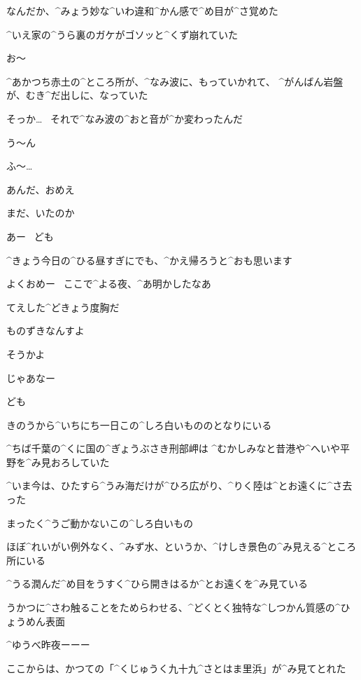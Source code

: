 \page[116]
\Alpha なんだか、^{みょう}{妙}な^{いわ}{違和}^{かん}{感}で^{め}{目}が^{さ}{覚}めた

\page[117]
\Alpha ^{いえ}{家}の^{うら}{裏}のガケがゴソッと^{くず}{崩}れていた

\Alpha お〜

\Alpha ^{あかつち}{赤土}の^{ところ}{所}が、^{なみ}{波}に、もっていかれて、
^{がんばん}{岩盤}が、むき^{だ}{出}しに、なっていた

\Alpha そっか…
\ それで^{なみ}{波}の^{おと}{音}が^{か}{変}わったんだ

\Alpha う〜ん

\page[118]
\Ayase ふ〜…

\page[121]
\Person あんだ、おめえ

\Person まだ、いたのか

\Ayase あー
\ ども

\page[122]
\Ayase ^{きょう}{今日}の^{ひる}{昼}すぎにでも、^{かえ}{帰}ろうと^{おも}{思}います

\Person よくおめー
\ ここで^{よる}{夜}、^{あ}{明}かしたなあ

\Person てえした^{どきょう}{度胸}だ

\Ayase ものずきなんすよ

\Person そうかよ

\page[123]
\Person じゃあなー

\Ayase ども

\page[124]
\Ayase きのうから^{いちにち}{一日}この^{しろ}{白}いもののとなりにいる

\Ayase ^{ちば}{千葉}の^{くに}{国}の^{ぎょうぶさき}{刑部岬}は
^{むかしみなと}{昔港}や^{へいや}{平野}を^{み}{見}おろしていた

\Ayase ^{いま}{今}は、ひたすら^{うみ}{海}だけが^{ひろ}{広}がり、^{りく}{陸}は^{とお}{遠}くに^{さ}{去}った

\page[125]
\Ayase まったく^{うご}{動}かないこの^{しろ}{白}いもの

\Ayase ほぼ^{れいがい}{例外}なく、^{みず}{水}、というか、^{けしき}{景色}の^{み}{見}える^{ところ}{所}にいる

\Ayase ^{うる}{潤}んだ^{め}{目}をうすく^{ひら}{開}きはるか^{とお}{遠}くを^{み}{見}ている

\Ayase うかつに^{さわ}{触}ることをためらわせる、^{どくとく}{独特}な^{しつかん}{質感}の^{ひょうめん}{表面}

\page[126]
\Ayase ^{ゆうべ}{昨夜}ーーー

\Ayase ここからは、かつての「^{くじゅうく}{九十九}^{さとはま}{里浜}」が^{み}{見}てとれた

